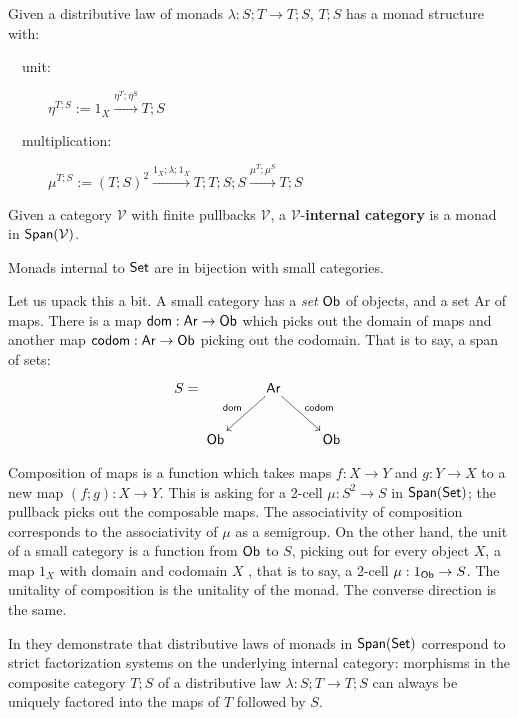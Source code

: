\begin{lemma}
Given a distributive law of monads $\lambda:S;T\to T;S$,
$T;S$ has a monad structure with:
\begin{description}
\item[\ \ unit:] $\eta^{T;S}:=1_{X} \xrightarrow{\eta^T;\eta^S} T;S $
\item[\ \ multiplication:] $\mu^{T;S}:=(T;S)^2 \xrightarrow{1_X; \lambda ; 1_X} T;T;S;S \xrightarrow{\mu^T;\mu^S} T;S$
\end{description}
\end{lemma}



\begin{definition}
\label{def:internalcat}

Given a category $\mathcal V$ with finite pullbacks $\mathcal V$, a $\mathcal V$-{\bf internal category} is a monad in $\mathsf{Span}(\mathcal V)$.
\end{definition}


\begin{lemma}
\label{lem:internalcat}

Monads internal to $\mathsf{Set}$ are in bijection with small categories.
\end{lemma}

Let us upack this a bit.  A small category has a {\em set} $\sf Ob$ of objects, and a set {\sf Ar} of maps.  There is a map ${\sf dom}:{\sf Ar}\to {\sf Ob}$ which picks out the domain of maps and another map  ${\sf codom}:{\sf Ar}\to {\sf Ob}$ picking out the codomain.  That is to say, a span of sets:
$$
S=\xymatrix{
& {\sf Ar} \ar[dl]_{{\sf dom}} \ar[dr]^{\sf codom}\\
{\sf Ob} & & {\sf Ob}
}
$$

Composition of maps is a function which takes maps $f:X\to Y$ and $g:Y\to X$ to a new map $(f;g):X\to Y$.   This is asking for a 2-cell $\mu:S^2\to S$ in $\mathsf{Span}(\mathsf{Set})$; the pullback picks out the composable maps.  The associativity of composition corresponds to the associativity of $\mu$ as a semigroup.
On the other hand, the unit of a small category is a function from ${\sf Ob}$ to $S$, picking out for every object $X$, a map $1_X$ with domain and codomain $X$ , that is to say, a 2-cell $\mu:1_{\sf Ob}\to S$.  The unitality of composition is the unitality of the monad.
The converse direction is the same.


In \cite{rosebrugh} they demonstrate that distributive laws of monads in  $\mathsf{Span}(\mathsf{Set})$ correspond to strict factorization systems on the underlying internal category:  morphisms in the composite category $T;S$ of a distributive law $\lambda:S;T\to T;S$ can always be uniquely factored into the maps of $T$ followed by $S$.  


